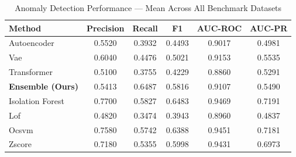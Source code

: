 \begin{table}[htbp]
\caption{Anomaly Detection Performance — Mean Across All Benchmark Datasets}
\begin{center}
\begin{tabular}{|l|c|c|c|c|c|}
\hline
\textbf{Method} & \textbf{Precision} & \textbf{Recall} & \textbf{F1} & \textbf{AUC-ROC} & \textbf{AUC-PR} \\
\hline
Autoencoder & 0.5520 & 0.3932 & 0.4493 & 0.9017 & 0.4981 \\
Vae & 0.6040 & 0.4476 & 0.5021 & 0.9153 & 0.5535 \\
Transformer & 0.5100 & 0.3755 & 0.4229 & 0.8860 & 0.5291 \\
\hline
\textbf{Ensemble (Ours)} & 0.5413 & 0.6487 & 0.5816 & 0.9107 & 0.5490 \\
Isolation Forest & 0.7700 & 0.5827 & 0.6483 & 0.9469 & 0.7191 \\
Lof & 0.4820 & 0.3474 & 0.3943 & 0.8960 & 0.4837 \\
Ocsvm & 0.7580 & 0.5742 & 0.6388 & 0.9451 & 0.7181 \\
Zscore & 0.7180 & 0.5355 & 0.5998 & 0.9431 & 0.6973 \\
\hline
\hline
\end{tabular}
\label{tab:main_results}
\end{center}
\end{table}
